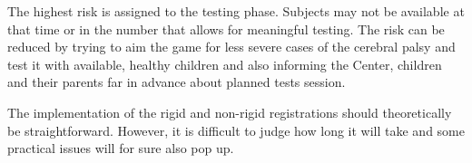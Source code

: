 \documentclass[10pt,a4paper]{article}
\begin{document}
The highest risk is assigned to the testing phase. Subjects may not be available at that time or in the number that allows for meaningful testing. The risk can be reduced by trying to aim the game for less severe cases of the cerebral palsy and test it with available, healthy children and also informing the Center, children and their parents far in advance about planned tests session.


The implementation of the rigid and non-rigid registrations should
theoretically be straightforward. However, it is difficult to judge how
long it will take and some practical issues will for sure also pop up.
\end{document}
